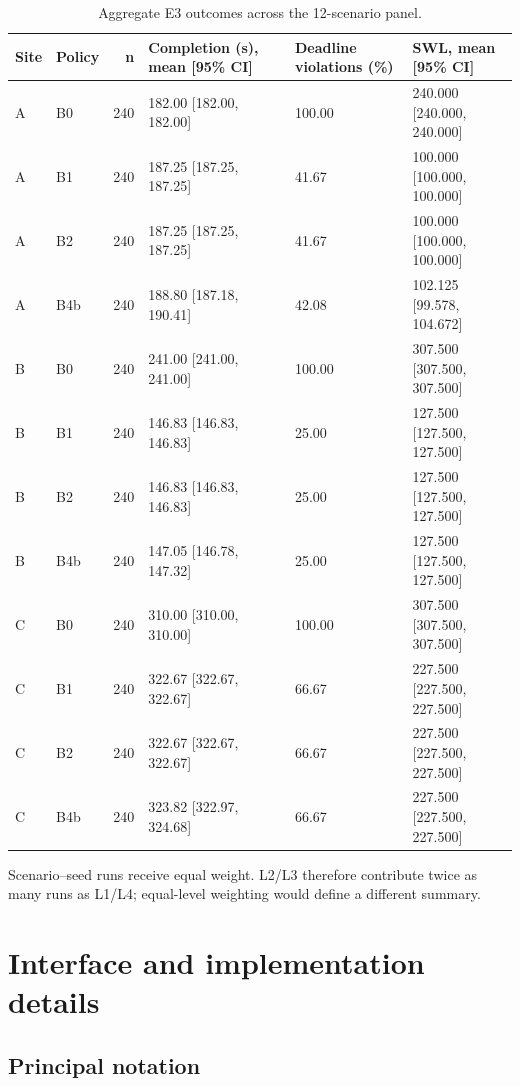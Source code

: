 \documentclass[11pt,a4paper]{article}
\begin{document}
\begin{table}[H]
\centering
\small
\setlength{\tabcolsep}{3pt}
\caption{Aggregate E3 outcomes across the 12-scenario panel.}
\label{tab:S7}
\begin{tabularx}{\textwidth}{@{}llrYYY@{}}
\toprule
Site & Policy & n & Completion (s), mean [95\% CI] & Deadline violations (\%) & SWL, mean [95\% CI] \\
\midrule
A & B0 & 240 & 182.00 [182.00, 182.00] & 100.00 & 240.000 [240.000, 240.000] \\
A & B1 & 240 & 187.25 [187.25, 187.25] & 41.67 & 100.000 [100.000, 100.000] \\
A & B2 & 240 & 187.25 [187.25, 187.25] & 41.67 & 100.000 [100.000, 100.000] \\
A & B4b & 240 & 188.80 [187.18, 190.41] & 42.08 & 102.125 [99.578, 104.672] \\
B & B0 & 240 & 241.00 [241.00, 241.00] & 100.00 & 307.500 [307.500, 307.500] \\
B & B1 & 240 & 146.83 [146.83, 146.83] & 25.00 & 127.500 [127.500, 127.500] \\
B & B2 & 240 & 146.83 [146.83, 146.83] & 25.00 & 127.500 [127.500, 127.500] \\
B & B4b & 240 & 147.05 [146.78, 147.32] & 25.00 & 127.500 [127.500, 127.500] \\
C & B0 & 240 & 310.00 [310.00, 310.00] & 100.00 & 307.500 [307.500, 307.500] \\
C & B1 & 240 & 322.67 [322.67, 322.67] & 66.67 & 227.500 [227.500, 227.500] \\
C & B2 & 240 & 322.67 [322.67, 322.67] & 66.67 & 227.500 [227.500, 227.500] \\
C & B4b & 240 & 323.82 [322.97, 324.68] & 66.67 & 227.500 [227.500, 227.500] \\
\bottomrule
\end{tabularx}
\end{table}

Scenario--seed runs receive equal weight. L2/L3 therefore contribute twice as many runs as L1/L4; equal-level weighting would define a different summary.

\section{Interface and implementation details}

\subsection{Principal notation}
\end{document}
